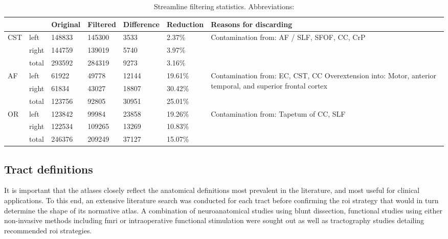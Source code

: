 \begin{table*}[t]
  \caption{Streamline filtering statistics. Abbreviations: }
  \label{tab:filt}
  \small
  \begin{tabularx}{\textwidth}{llllll X}\toprule
   &  & Original & Filtered & Difference & Reduction & Reasons for discarding \\
   \midrule
  CST & left & 148833 & 145300 & 3533 & 2.37\% & \multirow{3}{=}{Contamination from: AF / SLF, SFOF, CC, CrP} \\
   & right & 144759 & 139019 & 5740 & 3.97\% &  \\
   & total & 293592 & 284319 & 9273 & 3.16\% &  \\ \addlinespace
  AF & left & 61922 & 49778 & 12144 & 19.61\% & \multirow{3}{=}{Contamination from:  EC, CST, CC Overextension into: Motor, anterior temporal, and superior frontal cortex} \\
   & right & 61834 & 43027 & 18807 & 30.42\% &  \\
   & total & 123756 & 92805 & 30951 & 25.01\% &  \\ \addlinespace
  OR & left & 123842 & 99984 & 23858 & 19.26\% & \multirow{3}{=}{Contamination from: Tapetum of CC, SLF} \\
   & right & 122534 & 109265 & 13269 & 10.83\% &  \\
   & total & 246376 & 209249 & 37127 & 15.07\% & \\ \toprule
 \end{tabularx}
\end{table*}


\subsection{Tract definitions}

It is important that the atlases closely reflect the anatomical definitions most prevalent in the literature, and most useful for clinical applications.
To this end, an extensive literature search was conducted for each tract before confirming the \gls{roi} strategy that would in turn determine the shape of its normative atlas.
A combination of neuroanatomical studies using blunt dissection, functional studies using either non-invasive methods including \gls{fmri} or intraoperative functional stimulation were sought out as well as tractography studies detailing recommended \gls{roi} strategies.


